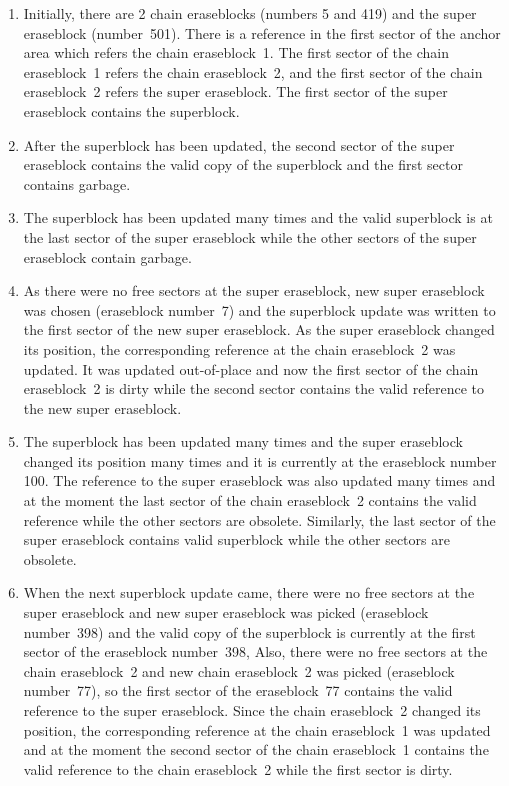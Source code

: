 \documentclass[12pt,a4paper,oneside,titlepage]{article}
\begin{document}
\begin{enumerate}

\item Initially, there are 2 chain eraseblocks (numbers 5 and 419) and the super
eraseblock (number~501). There is a reference in the first sector of the anchor
area which refers the chain eraseblock~1. The first sector of the chain
eraseblock~1 refers the chain eraseblock~2, and the first sector of the chain
eraseblock~2 refers the super eraseblock. The first sector of the super
eraseblock contains the superblock.

\item After the superblock has been updated, the second sector of the super
eraseblock contains the valid copy of the superblock and the first sector
contains garbage.

\item The superblock has been updated many times and the valid superblock is at
the last sector of the super eraseblock while the other sectors of the super
eraseblock contain garbage.

\item As there were no free sectors at the super eraseblock, new super
eraseblock was chosen (eraseblock number~7) and the superblock update was
written to the first sector of the new super eraseblock. As the super
eraseblock changed its position, the corresponding reference at the chain
eraseblock~2 was updated. It was updated \mbox{out-of-place} and now the first
sector of the chain eraseblock~2 is dirty while the second sector contains the
valid reference to the new super eraseblock.

\item The superblock has been updated many times and the super eraseblock
changed its position many times and it is currently at the eraseblock number
100. The reference to the super eraseblock was also updated many times and at
the moment the last sector of the chain eraseblock~2 contains the valid
reference while the other sectors are obsolete. Similarly, the last sector of
the super eraseblock contains valid superblock while the other sectors are
obsolete.

\item When the next superblock update came, there were no free sectors at the
super eraseblock and new super eraseblock was picked (eraseblock number~398)
and the valid copy of the superblock is currently at the first sector of the
eraseblock number~398, Also, there were no free sectors at the chain
eraseblock~2 and new chain eraseblock~2 was picked (eraseblock number~77), so
the first sector of the eraseblock~77 contains the valid reference to the super
eraseblock. Since the chain eraseblock~2 changed its position, the
corresponding reference at the chain eraseblock~1 was updated and at the moment
the second sector of the chain eraseblock~1 contains the valid reference to the
chain eraseblock~2 while the first sector is dirty.


\end{enumerate}
\end{document}
